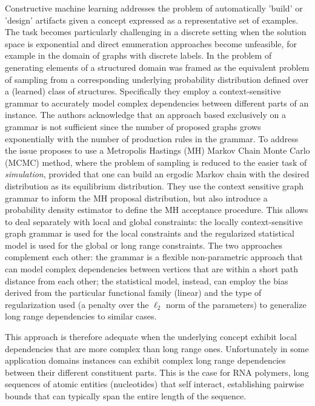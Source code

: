 \documentclass{article}
\begin{document}
Constructive machine learning addresses the problem of automatically 'build'
or 'design' artifacts given a concept expressed as a representative set of
examples. The task becomes particularly challenging in a discrete setting when
the solution space is exponential and direct enumeration approaches become
unfeasible, for example in the domain of graphs with discrete labels. In
\cite{costa16} the problem of generating elements of a structured domain was
framed as the equivalent problem of sampling from a corresponding underlying
probability distribution defined over a (learned) class of structures.
Specifically they employ a context-sensitive grammar to accurately model
complex dependencies between different parts of an instance. The authors
acknowledge that an approach based exclusively on a grammar is not sufficient
since the number of proposed graphs grows exponentially with the number of
production rules in the grammar. To address the issue
\cite{costa16} proposes to use a Metropolis Hastings (MH) Markov Chain Monte
Carlo (MCMC) method, where the problem of sampling is reduced to the easier
task of {\em simulation}, provided that one can build an ergodic Markov chain
with the desired distribution as its equilibrium distribution. They use the
context sensitive graph grammar to inform the MH proposal distribution, but
also introduce a probability density estimator to define the MH acceptance
procedure. This allows to deal separately with local and global constraints:
the locally context-sensitive graph grammar is used for the local constraints
and the regularized statistical model is used for the global or long range
constraints. The two approaches complement each other: the grammar is a
flexible non-parametric approach that can model complex dependencies between
vertices that are within a short path distance from each other; the
statistical model, instead, can employ the bias derived from the particular
functional family (linear) and the type of regularization used (a penalty over
the $\ell_2$ norm of the parameters) to generalize long range dependencies to
similar cases.

This approach is therefore adequate when the underlying concept exhibit local
dependencies that are more complex than long range ones.  Unfortunately in
some application domains instances can exhibit complex long range dependencies
between their different constituent parts. This is the case for RNA polymers,
long sequences of atomic entities (nucleotides) that self interact,
establishing pairwise bounds that can typically span the entire length of the
sequence.
\end{document}
